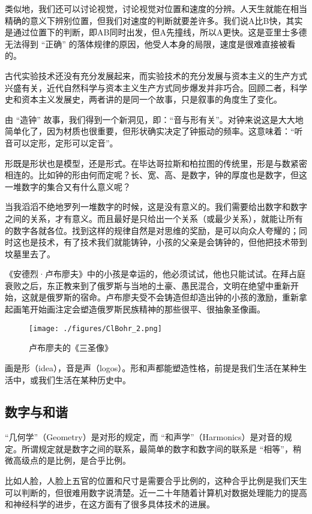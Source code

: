 类似地，我们还可以讨论视觉，讨论视觉对位置和速度的分辨。人天生就能在相当精确的意义下辨别位置，但我们对速度的判断就要差许多。我们说A比B快，其实是通过位置下的判断，即AB同时出发，但A先撞线，所以A更快。这是亚里士多德无法得到 “正确” 的落体规律的原因，他受人本身的局限，速度是很难直接被看的。

古代实验技术还没有充分发展起来，而实验技术的充分发展与资本主义的生产方式兴盛有关，近代自然科学与资本主义生产方式同步爆发并非巧合。回顾二者，科学史和资本主义发展史，两者讲的是同一个故事，只是叙事的角度生了变化。

由 “造钟” 故事，我们得到一个新洞见，即：“音与形有关”。对钟来说这是大大地简单化了，因为材质也很重要，但形状确实决定了钟振动的频率。这意味着：“听音可以定形，定形可以定音”。

形既是形状也是模型，还是形式。在毕达哥拉斯和柏拉图的传统里，形是与数紧密相连的。比如钟的形由何而定呢？长、宽、高、是数字，钟的厚度也是数字，但这一堆数字的集合又有什么意义呢？

当我滔滔不绝地罗列一堆数字的时候，这是没有意义的。我们需要给出数字和数字之间的关系，才有意义。而且最好是只给出一个关系（或最少关系），就能让所有的数字各就各位。找到这样的规律自然是对思维的奖励，是可以向众人夸耀的；同时这也是技术，有了技术我们就能铸钟，小孩的父亲是会铸钟的，但他把技术带到坟墓里去了。

《安德烈·卢布廖夫》中的小孩是幸运的，他必须试试，他也只能试试。在拜占庭衰败之后，东正教来到了俄罗斯与当地的土豪、愚民混合，文明在绝望中重新开始，这就是俄罗斯的宿命。卢布廖夫受不会铸造但却造出钟的小孩的激励，重新拿起画笔开始画注定会塑造俄罗斯民族精神的那些很平、很抽象圣像画。

\begin{figure}[ht]
\centering
\texttt{[image: ./figures/ClBohr\_2.png]}
\caption{卢布廖夫的《三圣像》} \label{ClBohr_fig2}
\end{figure}

画是形（idea），音是声（logos）。形和声都能塑造性格，前提是我们生活在某种生活中，或我们生活在某种历史中。

\subsection{数字与和谐}

“几何学”（Geometry）是对形的规定，而 “和声学”（Harmonics）是对音的规定。所谓规定就是数字之间的联系，最简单的数字和数字间的联系是 “相等”，稍微高级点的是比例，是合乎比例。

比如人脸，人脸上五官的位置和尺寸是需要合乎比例的，这种合乎比例是我们天生可以判断的，但很难用数字说清楚。近一二十年随着计算机对数据处理能力的提高和神经科学的进步，在这方面有了很多具体技术的进展。

